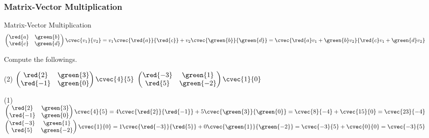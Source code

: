 \begin{frame}
\frametitle{Matrix-Vector Multiplication}
\begin{defn}{Matrix-Vector Multiplication}{}
\begin{equation}
\begin{pmatrix} \red{a} & \green{b} \\ \red{c} & \green{d} \end{pmatrix}\cvec{v_1}{v_2}  = v_1 \cvec{\red{a}}{\red{c}} + v_2 \cvec{\green{b}}{\green{d}} = \cvec{\red{a}v_1 + \green{b}v_2}{\red{c}v_1 +\green{d}v_2}
\end{equation}
\end{defn}
\end{frame}


\begin{frame}[t]
\begin{ex}
Compute the followings.
\begin{tasks}(2)
\task $\begin{pmatrix} \red{2} & \green{3} \\ \red{-1} & \green{0} \end{pmatrix}\cvec{4}{5}$
\task $\begin{pmatrix} \red{-3} & \green{1} \\ \red{5} & \green{-2} \end{pmatrix}\cvec{1}{0}$
\end{tasks}
\end{ex}
\begin{sol}
\begin{tasks}(1)
\task $\begin{pmatrix} \red{2} & \green{3} \\ \red{-1} & \green{0} \end{pmatrix}\cvec{4}{5} = 4 \cvec{\red{2}}{\red{-1}} + 5 \cvec{\green{3}}{\green{0}}
= \cvec{8}{-4} + \cvec{15}{0} = \cvec{23}{-4}$
\task $\begin{pmatrix} \red{-3} & \green{1} \\ \red{5} & \green{-2} \end{pmatrix}\cvec{1}{0} = 1 \cvec{\red{-3}}{\red{5}} + 0 \cvec{\green{1}}{\green{-2}}
= \cvec{-3}{5} + \cvec{0}{0} = \cvec{-3}{5}$
\end{tasks}
\end{sol}
\end{frame}


